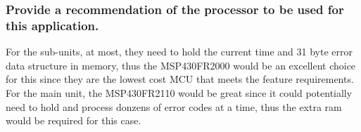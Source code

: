 \documentclass[12pt]{article} \usepackage{jeep} \usepackage{unicode}
\begin{document}
\subsubsection{Provide a recommendation of the processor to be used for this application.}
For the sub-units, at most, they need to hold the current time and 31 byte error data
structure in memory, thus the MSP430FR2000 would be an excellent choice for this
since they are the lowest cost MCU that meets the feature requirements. For the
main unit, the MSP430FR2110 would be great since it could potentially need to
hold and process donzens of error codes at a time, thus the extra ram would be
required for this case.

\end{document}
